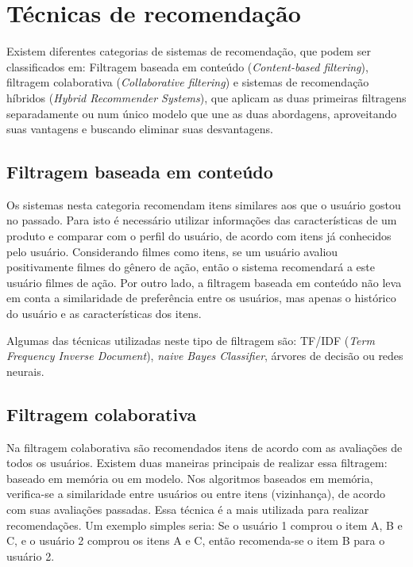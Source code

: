 \documentclass[12pt,a4paper,header]{abnt}
\begin{document}
\section{Técnicas de recomendação}

Existem diferentes categorias de sistemas de recomendação, que podem ser classificados em: Filtragem baseada em conteúdo (\textit{Content-based filtering}), filtragem colaborativa (\textit{Collaborative filtering}) e sistemas de recomendação híbridos (\textit{Hybrid Recommender Systems})\cite{melville2011recommender}, que aplicam as duas primeiras filtragens separadamente ou num único modelo que une as duas abordagens\cite{takahashi2015estudo}, aproveitando suas vantagens e buscando eliminar suas desvantagens\cite{shapira2011recommender}.

\subsection{Filtragem baseada em conteúdo}

Os sistemas nesta categoria recomendam itens similares aos que o usuário gostou no passado\cite{gorakala2015building}. Para isto é necessário utilizar informações das características de um produto\cite{shapira2011recommender} e comparar com o perfil do usuário, de acordo com itens já conhecidos pelo usuário. Considerando filmes como itens, se um usuário avaliou positivamente filmes do gênero de ação, então o sistema recomendará a este usuário filmes de ação. Por outro lado, a filtragem baseada em conteúdo não leva em conta a similaridade de preferência entre os usuários, mas apenas o histórico do usuário e as características dos itens\cite{gorakala2015building}.

Algumas das técnicas utilizadas neste tipo de filtragem são: TF/IDF (\textit{Term Frequency Inverse Document}), \textit{naive Bayes Classifier}, árvores de decisão ou redes neurais\cite{isinkaye2015recommendation}. 

\subsection{Filtragem colaborativa}

Na filtragem colaborativa são recomendados itens de acordo com as avaliações de todos os usuários\cite{melville2011recommender}. Existem duas maneiras principais de realizar essa filtragem: baseado em memória ou em modelo\cite{dakhel2011new}. Nos algoritmos baseados em memória, verifica-se a similaridade entre usuários ou entre itens (vizinhança), de acordo com suas avaliações passadas. Essa técnica é a mais utilizada para realizar recomendações\cite{shapira2011recommender}. Um exemplo simples seria: Se o usuário 1 comprou o item A, B e C, e o usuário 2 comprou os itens A e C, então recomenda-se o item B para o usuário 2.
\end{document}
